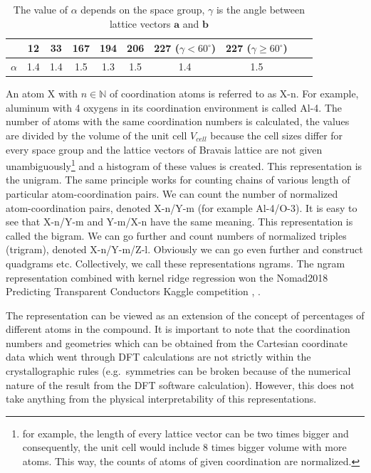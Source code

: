 \documentclass[11pt,oneside,czech,american]{book} %
\theoremstyle{definition} %
\theoremstyle{definition}
\begin{document}
\begin{table}[H]
	\centering
	\begin{tabular}{cccccccccc} 
		\hline
		&  12   &  33    & 167    & 194 & 206 & 227 ($\gamma<60^{\circ}$) & 227 ($\gamma \geq 60^{\circ}$)   \\ 
		\hline
		$\alpha$  & 1.4 & 1.4 & 1.5 & 1.3 & 1.5 & 1.4 & 1.5  \\ 
		\hline
	\end{tabular}
	\caption{The value of $\alpha$ depends on the space group, $\gamma$ is the angle between lattice vectors $\bm{a}$ and $\bm{b}$}
	\label{alpha}
\end{table}
An atom X with $n \in \mathbb{N}$ of coordination atoms is referred to as X-n. For example, aluminum with 4 oxygens in its coordination environment is called Al-4. The number of atoms with the same coordination numbers is calculated, the values are divided by the volume of the unit cell $V_{cell}$ because the cell sizes differ for every space group and the lattice vectors of Bravais lattice are not given unambiguously\footnote{for example, the length of every lattice vector can be two times bigger and consequently, the unit cell would include 8 times bigger volume with more atoms. This way, the counts of atoms of given coordination are normalized.} and a histogram of these values is created. This representation is the unigram. The same principle works for counting chains of various length of particular atom-coordination pairs. We can count the number of normalized atom-coordination pairs, denoted X-n/Y-m (for example Al-4/O-3). It is easy to see that X-n/Y-m and Y-m/X-n have the same meaning. This representation is called the bigram. We can go further and count numbers of normalized triples (trigram), denoted X-n/Y-m/Z-l. Obviously we can go even further and construct quadgrams etc. Collectively, we call these representations ngrams. The ngram representation combined with kernel ridge regression won the Nomad2018 Predicting Transparent Conductors Kaggle competition \parencite{sutton18}, \parencite{sutton19}.

The representation can be viewed as an extension of the concept of percentages of different atoms in the compound. It is important to note that the coordination numbers and geometries which can be obtained from the Cartesian coordinate data which went through DFT calculations are not strictly within the crystallographic rules (e.g.\ symmetries can be broken because of the numerical nature of the result from the DFT software calculation). However, this does not take anything from the physical interpretability of this representations.
\end{document}
